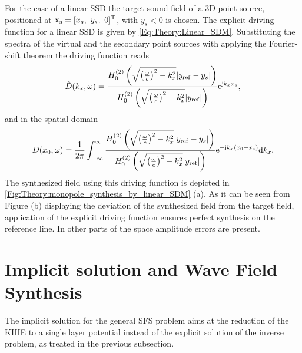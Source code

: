 \vspace{3mm}
For the case of a linear SSD the target sound field of a 3D point source, positioned at $\vxs = [x_s,\ y_s,\ 0]^{\mathrm{T}}$, with $y_s<0$ is chosen. The explicit driving function for a linear SSD is given by \eqref{Eq:Theory:Linear_SDM}. Substituting the spectra of the virtual and the secondary point sources with applying the Fourier-shift theorem the driving function reads
\begin{equation}
\hat{D}(k_x,\omega) = 
\frac{  H_0^{(2)} \left( \sqrt{ \left(\frac{\omega}{c}\right)^2 - k_x^2} |y_{\mathrm{ref}} - y_s| \right)  }
     {  H_0^{(2)} \left( \sqrt{ \left(\frac{\omega}{c}\right)^2 - k_x^2} |y_{\mathrm{ref}}|       \right)  }
\mathrm{e}^{\mathrm{j} k_x x_s},
\end{equation}
and in the spatial domain
\begin{equation}
D(x_0,\omega) = \frac{1}{2\pi} \int_{-\infty}^{\infty} 
\frac{  H_0^{(2)} \left( \sqrt{ \left(\frac{\omega}{c}\right)^2 - k_x^2} |y_{\mathrm{ref}} - y_s| \right)  }
     {  H_0^{(2)} \left( \sqrt{ \left(\frac{\omega}{c}\right)^2 - k_x^2} |y_{\mathrm{ref}}|       \right)  }
\mathrm{e}^{- \mathrm{j} k_x (x_0 - x_s)}
\mathrm{d} k_x.
\end{equation}
The synthesized field using this driving function is depicted in \ref{Fig:Theory:monopole_synthesis_by_linear_SDM} (a). 
As it can be seen from Figure (b) displaying the deviation of the synthesized field from the target field, application of the explicit driving function ensures perfect synthesis on the reference line. In other parts of the space amplitude errors are present.
\newpage

\section{Implicit solution and Wave Field Synthesis}

The implicit solution for the general SFS problem aims at the reduction of the KHIE to a single layer potential instead of the explicit solution of the inverse problem, as treated in the previous subsection. 

